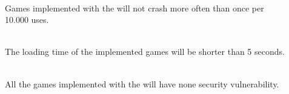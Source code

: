 \vspace{.5cm}

\begin{description}
	\item[] \textbf{}  \\
	Games implemented with the {\graphioli} will not crash more often than once per 10.000 uses. \\
	\item[] \textbf{} \\
	The loading time of the implemented games will be shorter than 5 seconds. \\
	\item[] \textbf{} \\
	All the games implemented with the {\graphioli} will have none security vulnerability.
\end{description}
